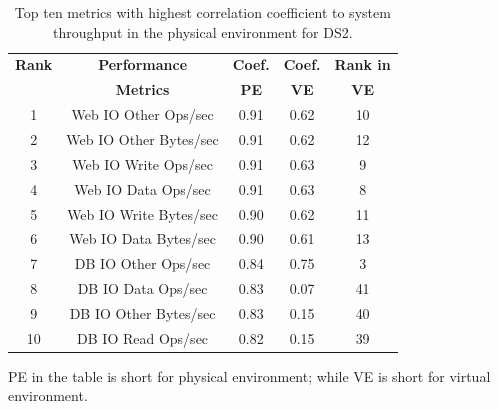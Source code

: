 \documentclass[smallextended]{svjour3}       %
\begin{document}
\begin{table}[tbh]
	\centering
	\caption{Top ten metrics with highest correlation coefficient to system throughput in the physical environment for DS2. }
	\label{tab:top10ds2p}
	\begin{threeparttable}
		
		\begin{tabular}{|c||c|c|c|c|}
			\hline
			\textbf{Rank} & \textbf{Performance } & \textbf{Coef. } & \textbf{Coef. } & \textbf{Rank in} \\ %
			& \textbf{ Metrics} & \textbf{PE} & \textbf{VE} & \textbf{VE} \\ %
			\midrule
			\midrule
			1 & Web IO Other Ops/sec & 0.91 & 0.62 & 10 \\ \hline
			2 & Web IO Other Bytes/sec & 0.91 & 0.62 & 12 \\ \hline
			3 & Web IO Write Ops/sec & 0.91 & 0.63 & 9 \\ \hline
			4 & Web IO Data Ops/sec & 0.91 & 0.63 & 8 \\ \hline
			5 & Web IO Write Bytes/sec & 0.90 & 0.62 & 11 \\ \hline
			6 & Web IO Data Bytes/sec & 0.90 & 0.61 & 13 \\ \hline
			7 & DB IO Other Ops/sec & 0.84 & 0.75 & 3 \\ \hline
			8 & DB IO Data Ops/sec & 0.83 & 0.07 & 41 \\ \hline
			9 & DB IO Other Bytes/sec & 0.83 & 0.15 & 40 \\ \hline
			10 & DB IO Read Ops/sec & 0.82 & 0.15 & 39 \\ \hline
		\end{tabular}%
		\begin{tablenotes}
			\item PE in the table is short for physical environment; while VE is short for virtual environment.
		\end{tablenotes}
	\end{threeparttable}
	
	
\end{table}
\end{document}
